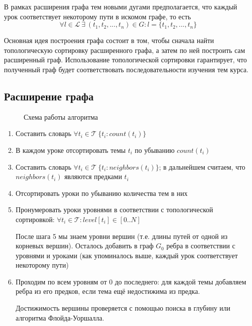 \documentclass[14pt]{matmex-diploma-custom}
\begin{document}
В рамках расширения графа тем новыми дугами предполагается, что каждый урок соответствует некоторому пути в искомом графе, то есть 
$$\forall l \in \mathcal{L} ~\exists~ (t_1, t_2, ..., t_n) \in G : l = \{t_1, t_2, ..., t_n\}$$

Основная идея построения графа состоит в том, чтобы сначала найти топологическую сортировку расширенного графа, а затем по ней построить сам расширенный граф. Использование топологической сортировки гарантирует, что полученный граф будет соответствовать последовательности изучения тем курса.

\subsection{Расширение графа}

\begin{figure}[!htb]
\caption{Схема работы алгоритма}
\label{report}
\end{figure}


\begin{enumerate}
    \item Составить словарь $\forall t_i \in \mathcal{T}~ \{ t_i: count(t_i) \}$
    
    \item В каждом уроке отсортировать темы $t_i$ по убыванию $count(t_i)$
    
    \item Составить словарь $\forall t_i \in \mathcal{T}~ \{ t_i: neighbors(t_i) \}$; в дальнейшем считаем, что $neighbors(t_i)$ являются предками $t_i$
    \item Отсортировать уроки по убыванию количества тем в них
    
    \item Пронумеровать уроки уровнями в соответствии с топологической сортировкой: $\forall t_i \in \mathcal{T}: level[t_i] \in [0..N]$
    
    После шага 5 мы знаем уровни вершин (т.е. длины путей от одной из корневых вершин).
    Осталось добавить в граф $G_0$ ребра в соответствии с уровнями и уроками (как упоминалось выше, каждый урок соответствует некоторому пути)
    
    \item Проходим по всем уровням от 0 до последнего:
    для каждой темы добавляем ребра из его предков, если тема ещё недостижима из предка.
    
    Достижимость вершины проверяется с помощью поиска в глубину или алгоритма Флойда-Уоршалла.
\end{enumerate}
\end{document}
